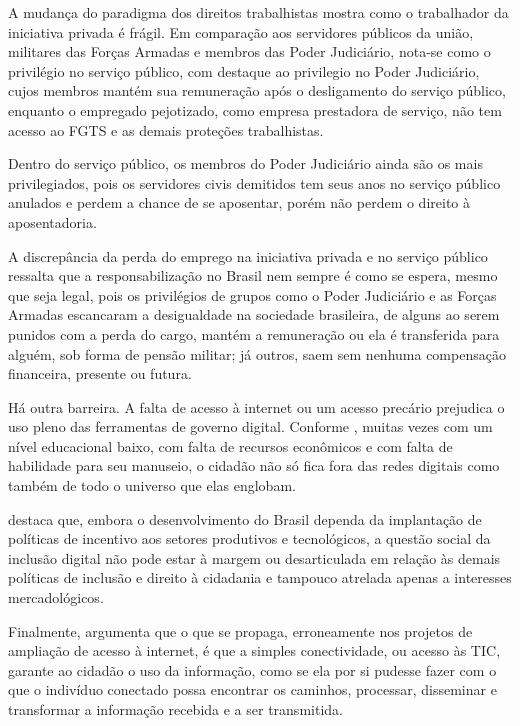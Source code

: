 A mudança do paradigma dos direitos trabalhistas mostra como o trabalhador da iniciativa privada é frágil. Em comparação aos servidores públicos da união, militares das Forças Armadas e membros das Poder Judiciário, nota-se como o privilégio no serviço público, com destaque ao privilegio no Poder Judiciário, cujos membros mantém sua remuneração após o desligamento do serviço público, enquanto o empregado pejotizado, como empresa prestadora de serviço, não tem acesso ao FGTS e as demais proteções trabalhistas. 

Dentro do serviço público, os membros do Poder Judiciário ainda são os mais privilegiados, pois os servidores civis demitidos tem seus anos no serviço público anulados e perdem a chance de se aposentar, porém não perdem o direito à aposentadoria.

A discrepância da perda do emprego na iniciativa privada e no serviço público ressalta que a responsabilização no Brasil nem sempre é como se espera, mesmo que seja legal, pois os privilégios de grupos como o Poder Judiciário e as Forças Armadas escancaram a desigualdade na sociedade brasileira, de alguns ao serem punidos com a perda do cargo, mantém a remuneração ou ela é transferida para alguém, sob forma de pensão militar; já outros, saem sem nenhuma compensação financeira, presente ou futura. 

Há outra barreira. A falta de acesso à internet ou um acesso precário prejudica o uso pleno das ferramentas de governo digital. Conforme \cite{grossi2014inclusao}, muitas vezes com um nível educacional baixo, com falta de recursos econômicos e com falta de habilidade para seu manuseio, o cidadão não só fica fora das redes digitais como também de todo o universo que elas englobam. 

\cite{grossi2014inclusao} destaca que, embora o desenvolvimento do Brasil dependa da implantação de políticas de incentivo aos setores produtivos e tecnológicos, a questão social da inclusão digital não pode estar à margem ou desarticulada em relação às demais políticas de inclusão e direito à cidadania e tampouco atrelada apenas a interesses mercadológicos.

Finalmente, \cite{grossi2014inclusao} argumenta que o que se propaga, erroneamente nos projetos de ampliação de acesso à internet, é que a simples conectividade, ou acesso às TIC, garante ao cidadão o uso da informação, como se ela por si pudesse fazer com o que o indivíduo conectado possa encontrar os caminhos, processar, disseminar e transformar a informação recebida e a ser transmitida.